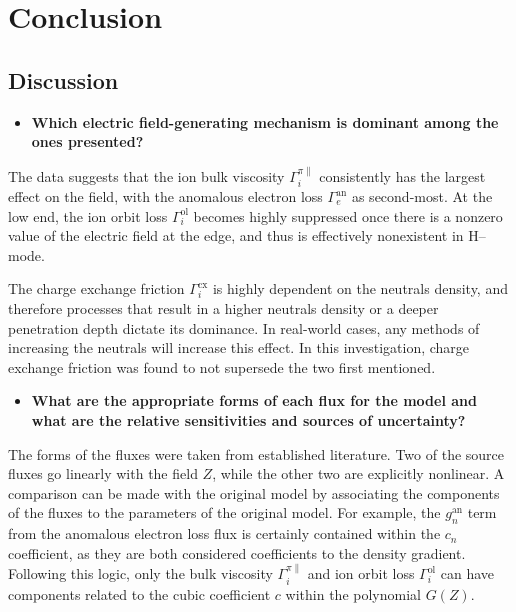 \chapter{Conclusion} \label{chapter:conclusion}
\section{Discussion} \label{sec:discussion}
\begin{itemize}
	\item \textbf{Which electric field-generating mechanism is dominant among the ones presented?}
\end{itemize}

The data suggests that the ion bulk viscosity $\Gamma_i^{\pi\parallel}$ consistently has the largest effect on the field, with the anomalous electron loss $\Gamma_e^\text{an}$ as second-most.
At the low end, the ion orbit loss $\Gamma_i^\text{ol}$ becomes highly suppressed once there is a nonzero value of the electric field at the edge, and thus is effectively nonexistent in H--mode.

The charge exchange friction $\Gamma_i^\text{cx}$ is highly dependent on the neutrals density, and therefore processes that result in a higher neutrals density or a deeper penetration depth dictate its dominance.
In real-world cases, any methods of increasing the neutrals will increase this effect.
In this investigation, charge exchange friction was found to not supersede the two first mentioned.

\begin{itemize}
	\item \textbf{What are the appropriate forms of each flux for the model and what are the relative sensitivities and sources of uncertainty?}
\end{itemize}

The forms of the fluxes were taken from established literature.
Two of the source fluxes go linearly with the field $Z$, while the other two are explicitly nonlinear.
A comparison can be made with the original model by associating the components of the fluxes to the parameters of the original model.
For example, the $g_n^\text{an}$ term from the anomalous electron loss flux is certainly contained within the $c_n$ coefficient, as they are both considered coefficients to the density gradient.
Following this logic, only the bulk viscosity $\Gamma_i^{\pi\parallel}$ and ion orbit loss $\Gamma_i^\text{ol}$ can have components related to the cubic coefficient $c$ within the polynomial $G(Z)$.

